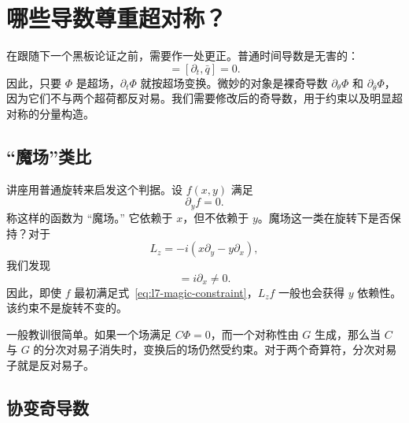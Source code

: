 \section{哪些导数尊重超对称？}

在跟随下一个黑板论证之前，需要作一处更正。普通时间导数是无害的：
\begin{equation}
[\partial_t,q]=[\partial_t,\bar q]=0.
\end{equation}
因此，只要 \(\Phi\) 是超场，\(\partial_t\Phi\) 就按超场变换。微妙的对象是裸奇导数 \(\partial_\theta\Phi\) 和 \(\partial_{\bar\theta}\Phi\)，因为它们不与两个超荷都反对易。我们需要修改后的奇导数，用于约束以及明显超对称的分量构造。

\subsection{``魔场''类比}

讲座用普通旋转来启发这个判据。设 \(f(x,y)\) 满足
\begin{equation}
\partial_y f=0.
\label{eq:l7-magic-constraint}
\end{equation}
称这样的函数为 ``魔场。'' 它依赖于 \(x\)，但不依赖于 \(y\)。魔场这一类在旋转下是否保持？对于
\begin{equation}
L_z=-i\left(x\partial_y-y\partial_x\right),
\end{equation}
我们发现
\begin{equation}
[\partial_y,L_z]=i\partial_x\neq0.
\end{equation}
因此，即使 \(f\) 最初满足式~\eqref{eq:l7-magic-constraint}，\(L_z f\) 一般也会获得 \(y\) 依赖性。该约束不是旋转不变的。

一般教训很简单。如果一个场满足 \(C\Phi=0\)，而一个对称性由 \(G\) 生成，那么当 \(C\) 与 \(G\) 的分次对易子消失时，变换后的场仍然受约束。对于两个奇算符，分次对易子就是反对易子。

\begin{classroomqa}
\end{classroomqa}

\subsection{协变奇导数}

